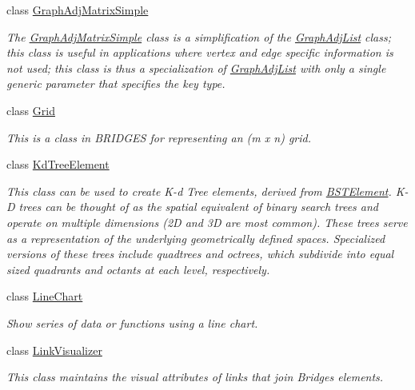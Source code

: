 \begin{DoxyCompactItemize}
class \hyperlink{classbridges_1_1base_1_1_graph_adj_matrix_simple}{Graph\+Adj\+Matrix\+Simple}
\begin{DoxyCompactList}\small\item\em The \hyperlink{classbridges_1_1base_1_1_graph_adj_matrix_simple}{Graph\+Adj\+Matrix\+Simple} class is a simplification of the \hyperlink{classbridges_1_1base_1_1_graph_adj_list}{Graph\+Adj\+List} class; this class is useful in applications where vertex and edge specific information is not used; this class is thus a specialization of \hyperlink{classbridges_1_1base_1_1_graph_adj_list}{Graph\+Adj\+List} with only a single generic parameter that specifies the key type. \end{DoxyCompactList}\item 
class \hyperlink{classbridges_1_1base_1_1_grid}{Grid}
\begin{DoxyCompactList}\small\item\em This is a class in B\+R\+I\+D\+G\+ES for representing an (m x n) grid. \end{DoxyCompactList}\item 
class \hyperlink{classbridges_1_1base_1_1_kd_tree_element}{Kd\+Tree\+Element}
\begin{DoxyCompactList}\small\item\em This class can be used to create K-\/d Tree elements, derived from \hyperlink{classbridges_1_1base_1_1_b_s_t_element}{B\+S\+T\+Element}. K-\/D trees can be thought of as the spatial equivalent of binary search trees and operate on multiple dimensions (2D and 3D are most common). These trees serve as a representation of the underlying geometrically defined spaces. Specialized versions of these trees include quadtrees and octrees, which subdivide into equal sized quadrants and octants at each level, respectively. \end{DoxyCompactList}\item 
class \hyperlink{classbridges_1_1base_1_1_line_chart}{Line\+Chart}
\begin{DoxyCompactList}\small\item\em Show series of data or functions using a line chart. \end{DoxyCompactList}\item 
class \hyperlink{classbridges_1_1base_1_1_link_visualizer}{Link\+Visualizer}
\begin{DoxyCompactList}\small\item\em This class maintains the visual attributes of links that join Bridges elements. \end{DoxyCompactList}\item 

\end{DoxyCompactItemize}
